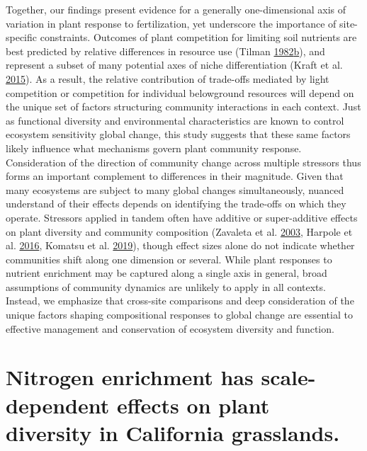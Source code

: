 \documentclass[twoside,12pt,final]{ucthesis-CA2012}
\begin{document}
\begin{ucmainmatter}
Together, our findings present evidence for a generally one-dimensional axis of variation in plant response to fertilization, yet underscore the importance of site-specific constraints. Outcomes of plant competition for limiting soil nutrients are best predicted by relative differences in resource use (Tilman \protect\hyperlink{ref-Tilman1982}{1982}\protect\hyperlink{ref-Tilman1982}{b}), and represent a subset of many potential axes of niche differentiation (Kraft et al. \protect\hyperlink{ref-Kraft2015}{2015}). As a result, the relative contribution of trade-offs mediated by light competition or competition for individual belowground resources will depend on the unique set of factors structuring community interactions in each context.
Just as functional diversity and environmental characteristics are known to control ecosystem sensitivity global change, this study suggests that these same factors likely influence what mechanisms govern plant community response. Consideration of the direction of community change across multiple stressors thus forms an important complement to differences in their magnitude. Given that many ecosystems are subject to many global changes simultaneously, nuanced understand of their effects depends on identifying the trade-offs on which they operate. Stressors applied in tandem often have additive or super-additive effects on plant diversity and community composition (Zavaleta et al. \protect\hyperlink{ref-Zavaleta2003}{2003}, Harpole et al. \protect\hyperlink{ref-Harpole2016}{2016}, Komatsu et al. \protect\hyperlink{ref-Komatsu2019}{2019}), though effect sizes alone do not indicate whether communities shift along one dimension or several. While plant responses to nutrient enrichment may be captured along a single axis in general, broad assumptions of community dynamics are unlikely to apply in all contexts. Instead, we emphasize that cross-site comparisons and deep consideration of the unique factors shaping compositional responses to global change are essential to effective management and conservation of ecosystem diversity and function.

\hypertarget{nitrogen-enrichment-has-scale-dependent-effects-on-plant-diversity-in-california-grasslands.}{%
\chapter{Nitrogen enrichment has scale-dependent effects on plant diversity in California grasslands.}\label{nitrogen-enrichment-has-scale-dependent-effects-on-plant-diversity-in-california-grasslands.}}


\end{ucmainmatter}
\end{document}
